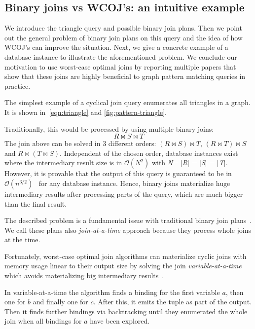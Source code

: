 \subsection{Binary joins vs \textsc{WCOJ}'s: an intuitive example} \label{subsec:intuitive-example}
We introduce the triangle query and possible binary join plans.
Then we point out the general problem of binary join plans on this query and the idea of how \textsc{WCOJ}'s can improve the situation.
Next, we give a concrete example of a database instance to illustrate the aforementioned problem.
We conclude our motivation to use worst-case optimal joins by reporting multiple papers that show that these joins are highly beneficial
to graph pattern matching queries in practice.

The simplest example of a cyclical join query enumerates all triangles in a graph.
It is shown in~\cref{eqn:triangle} and \cref{fig:pattern-triangle}.

Traditionally, this would be processed by using multiple binary joins:
\begin{equation}
    R \bowtie S \bowtie T
\end{equation}
The join above can be solved in 3 different orders: $ (R \bowtie S) \bowtie T$, $ (R \bowtie T) \bowtie S$ and
$ R \bowtie (T \bowtie S)$.
Independent of the chosen order, database instances exist where the intermediary result size is in $\mathcal{O}(N^2)$ with
\textit{N}= |\textit{R}| = |\textit{S}| = |\textit{T}|.
However, it is provable that the output of this query is guaranteed to be in $\mathcal{O}(n^{3/2})$~\cite{agm,skew-strikes-back}
for any database instance.
Hence, binary joins materialize huge intermediary results after processing parts of the query,
which are much bigger than the final result.

The described problem is a fundamental issue with traditional binary join plans~\cite{agm,skew-strikes-back}.
We call these plans also \textit{join-at-a-time} approach because they process whole joins at the time.

Fortunately, worst-case optimal join algorithms can materialize cyclic joins with memory usage linear to their output size
by solving the join \textit{variable-at-a-time} which avoids materializing big intermediary results~\cite{lftj,nprr}.

In variable-at-a-time the algorithm finds a binding for the first variable $a$, then one for $b$ and
finally one for $c$.
After this, it emits the tuple as part of the output.
Then it finds further bindings via backtracking until they enumerated the whole join when all bindings for $a$ have been explored.

